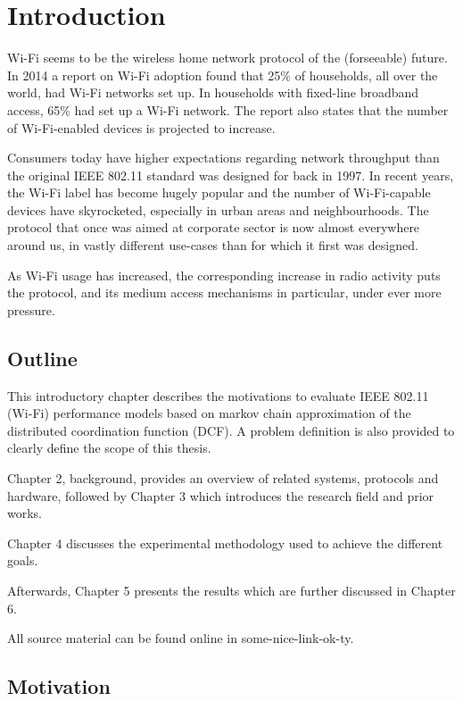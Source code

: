 
\chapter{Introduction}

Wi-Fi seems to be the wireless home network protocol of the (forseeable)
future. In 2014 a report on Wi-Fi adoption found that 25\% of households, all
over the world, had Wi-Fi networks set up. In households with fixed-line
broadband access, 65\% had set up a Wi-Fi network\cite{smith}. The report also
states that the number of Wi-Fi-enabled devices is projected to increase.

Consumers today have higher expectations regarding network throughput than the
original IEEE 802.11 standard was designed for back in 1997. In recent years,
the Wi-Fi label has become hugely popular and the number of Wi-Fi-capable
devices have skyrocketed, especially in urban areas and neighbourhoods. The
protocol that once was aimed at corporate sector is now almost everywhere
around us, in vastly different use-cases than for which it first was designed.

As Wi-Fi usage has increased, the corresponding increase in radio activity
puts the protocol, and its medium access mechanisms in particular, under ever
more pressure. 

\section{Outline} 

This introductory chapter describes the motivations to evaluate IEEE 802.11
(Wi-Fi) performance models based on markov chain approximation of the
distributed coordination function (DCF). A problem definition is also provided
to clearly define the scope of this thesis.

Chapter 2, background, provides an overview of related systems, protocols and
hardware, followed by Chapter 3 which introduces the research field and prior
works.

Chapter 4 discusses the experimental methodology used to achieve the different
goals.	

Afterwards, Chapter 5 presents the results which are further discussed in
Chapter 6.

All source material can be found online in some-nice-link-ok-ty.

\section{Motivation} 

